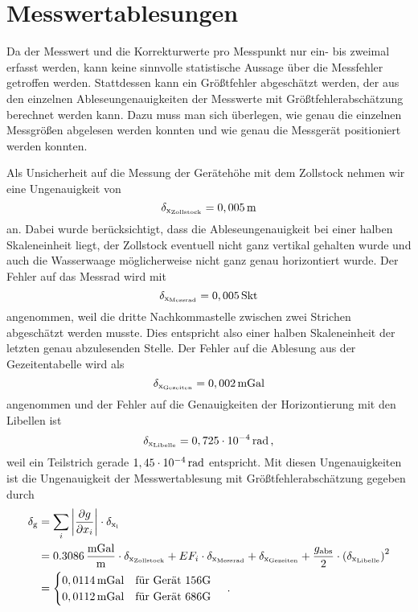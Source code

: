 \section{Messwertablesungen}

Da der Messwert und die Korrekturwerte pro Messpunkt nur ein- bis zweimal erfasst werden, kann keine sinnvolle statistische Aussage über die Messfehler getroffen werden. Stattdessen kann ein Größtfehler abgeschätzt werden, der aus den einzelnen Ableseungenauigkeiten der Messwerte mit Größtfehlerabschätzung berechnet werden kann. Dazu muss man sich überlegen, wie genau die einzelnen Messgrößen abgelesen werden konnten und wie genau die Messgerät positioniert werden konnten.

Als Unsicherheit auf die Messung der Gerätehöhe mit dem Zollstock nehmen wir eine Ungenauigkeit von
\begin{equation}
 \delta_{\mathrm{x_{\mathrm{Zollstock}}}}=0,005\,\mathrm{m}
\end{equation}
an. Dabei wurde berücksichtigt, dass die Ableseungenauigkeit bei einer halben Skaleneinheit liegt, der Zollstock eventuell nicht ganz vertikal gehalten wurde und auch die Wasserwaage möglicherweise nicht ganz genau horizontiert wurde. Der Fehler auf das Messrad wird mit
\begin{equation}
 \delta_{\mathrm{x_{\mathrm{Messrad}}}}=0,005\,\mathrm{Skt}
\end{equation}
angenommen, weil die dritte Nachkommastelle zwischen zwei Strichen abgeschätzt werden musste. Dies entspricht also einer halben Skaleneinheit der letzten genau abzulesenden Stelle. Der Fehler auf die Ablesung aus der Gezeitentabelle wird als
\begin{equation}
 \delta_{\mathrm{x_{\mathrm{Gezeiten}}}}=0,002\,\mathrm{mGal}
\end{equation}
angenommen und der Fehler auf die Genauigkeiten der Horizontierung  mit den Libellen ist
\begin{equation}
 \delta_{\mathrm{x_{\mathrm{Libelle}}}}=0,725\cdot 10^{-4}\,\mathrm{rad} \text{\,,}
\end{equation}
weil ein Teilstrich gerade $1,45\cdot 10^{-4}\,\mathrm{rad}$ entspricht.
Mit diesen Ungenauigkeiten ist die Ungenauigkeit der Messwertablesung mit Größtfehlerabschätzung gegeben durch
\begin{align}
 \delta_{\mathrm{g}}&=\sum_i \left| \frac{\partial g}{\partial x_i} \right|\cdot \delta_{\mathrm{x_i}} \\
 &=0.3086\,\frac{\mathrm{mGal}}{\mathrm{m}}\cdot \delta_{\mathrm{x_{\mathrm{Zollstock}}}} + EF_i \cdot \delta_{\mathrm{x_{\mathrm{Messrad}}}} +
 \delta_{\mathrm{x_{\mathrm{Gezeiten}}}} + \frac{g_{\mathrm{abs}}}{2} \cdot \left( \delta_{\mathrm{x_{\mathrm{Libelle}}}} \right)^2 \\
 &= \begin{cases}
     0,0114\,\mathrm{mGal} \quad \text{für Gerät 156G}\\
     0,0112\,\mathrm{mGal} \quad \text{für Gerät 686G}
    \end{cases}
 \text{\,.}
\end{align}
